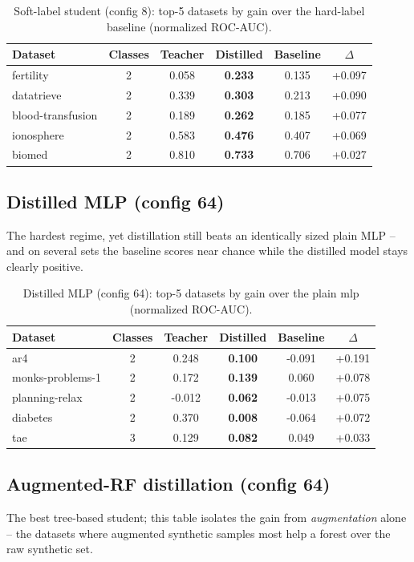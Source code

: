 \documentclass[10pt]{article}
\begin{document}
\begin{table}[!ht]
\centering\small
\caption{Soft-label student (config 8): top-5 datasets by gain over the hard-label baseline (normalized ROC-AUC).}
\label{tab:student8}
\begin{tabular}{lccccc}
\toprule
Dataset & Classes & Teacher & Distilled & Baseline & $\Delta$ \\
\midrule
fertility & 2 & 0.058 & \textbf{0.233} & 0.135 & +0.097 \\
datatrieve & 2 & 0.339 & \textbf{0.303} & 0.213 & +0.090 \\
blood-transfusion & 2 & 0.189 & \textbf{0.262} & 0.185 & +0.077 \\
ionosphere & 2 & 0.583 & \textbf{0.476} & 0.407 & +0.069 \\
biomed & 2 & 0.810 & \textbf{0.733} & 0.706 & +0.027 \\
\bottomrule
\end{tabular}
\end{table}

\subsection*{Distilled MLP (config 64)}
The hardest regime, yet distillation still beats an identically sized plain MLP -- and on several sets the baseline scores near chance while the distilled model stays clearly positive.

\begin{table}[!ht]
\centering\small
\caption{Distilled MLP (config 64): top-5 datasets by gain over the plain mlp (normalized ROC-AUC).}
\label{tab:mlp}
\begin{tabular}{lccccc}
\toprule
Dataset & Classes & Teacher & Distilled & Baseline & $\Delta$ \\
\midrule
ar4 & 2 & 0.248 & \textbf{0.100} & -0.091 & +0.191 \\
monks-problems-1 & 2 & 0.172 & \textbf{0.139} & 0.060 & +0.078 \\
planning-relax & 2 & -0.012 & \textbf{0.062} & -0.013 & +0.075 \\
diabetes & 2 & 0.370 & \textbf{0.008} & -0.064 & +0.072 \\
tae & 3 & 0.129 & \textbf{0.082} & 0.049 & +0.033 \\
\bottomrule
\end{tabular}
\end{table}

\subsection*{Augmented-RF distillation (config 64)}
The best tree-based student; this table isolates the gain from \emph{augmentation} alone -- the datasets where augmented synthetic samples most help a forest over the raw synthetic set.
\end{document}

